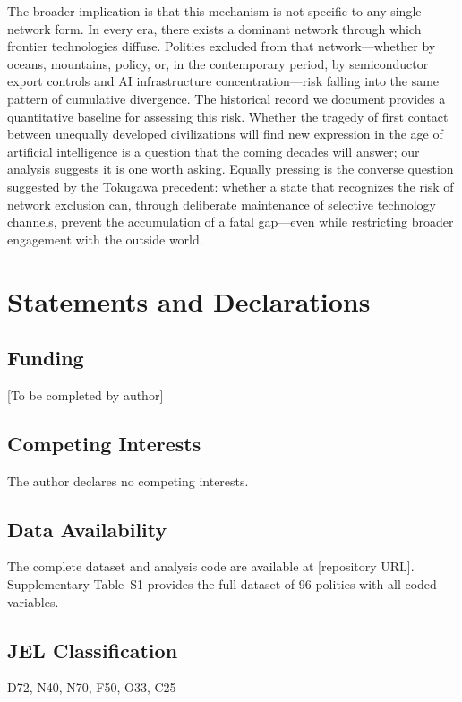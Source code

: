 \documentclass[pdflatex,sn-basic]{sn-jnl}
\theoremstyle{thmstyleone}%
\theoremstyle{thmstyletwo}%
\theoremstyle{thmstylethree}%
\begin{document}
The broader implication is that this mechanism is not specific to any single network form. In every era, there exists a dominant network through which frontier technologies diffuse. Polities excluded from that network---whether by oceans, mountains, policy, or, in the contemporary period, by semiconductor export controls and AI infrastructure concentration---risk falling into the same pattern of cumulative divergence. The historical record we document provides a quantitative baseline for assessing this risk. Whether the tragedy of first contact between unequally developed civilizations will find new expression in the age of artificial intelligence is a question that the coming decades will answer; our analysis suggests it is one worth asking. Equally pressing is the converse question suggested by the Tokugawa precedent: whether a state that recognizes the risk of network exclusion can, through deliberate maintenance of selective technology channels, prevent the accumulation of a fatal gap---even while restricting broader engagement with the outside world.

\section*{Statements and Declarations}

\subsection*{Funding}
[To be completed by author]

\subsection*{Competing Interests}
The author declares no competing interests.

\subsection*{Data Availability}
The complete dataset and analysis code are available at [repository URL]. Supplementary Table~S1 provides the full dataset of 96 polities with all coded variables.

\subsection*{JEL Classification}
D72, N40, N70, F50, O33, C25


\end{document}
